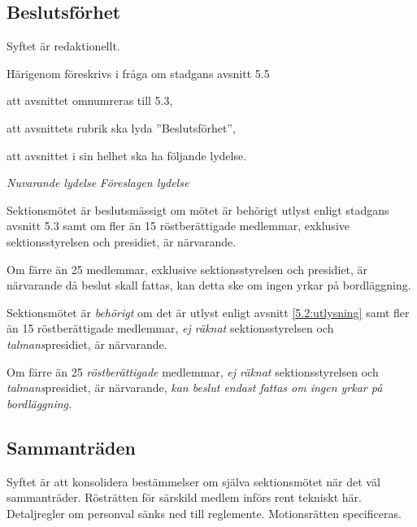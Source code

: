 \documentclass{article}
\newenvironment{lydelse}
    {\begin{paracol}{2}%
        \emph{Nuvarande lydelse}%
        \switchcolumn%
        \emph{Föreslagen lydelse}%
    \end{paracol}%
    \begin{enumerate}[label=\thesubsection.\arabic*]%
    \begin{paracol}{2}%
    }{\end{paracol}\end{enumerate}}
\begin{document}
\setcounter{subsection}{2}
\subsection{Beslutsförhet}
Syftet är redaktionellt.

Härigenom föreskrivs i fråga om stadgans avsnitt 5.5
\begin{dels}
  \item att avsnittet omnumreras till 5.3,
  \item att avsnittets rubrik ska lyda ''Beslutsförhet'',
  \item att avsnittet i sin helhet ska ha följande lydelse.
\end{dels}

\begin{lydelse}
  \setcounter{subsection}{5}
  \item Sektionsmötet är beslutsmässigt om mötet är behörigt utlyst enligt stadgans avsnitt 5.3 samt om fler än 15 röstberättigade medlemmar, exklusive sektionsstyrelsen och presidiet, är närvarande.
  \item Om färre än 25 medlemmar, exklusive sektionsstyrelsen och presidiet, är närvarande då beslut skall fattas, kan detta ske om ingen yrkar på bordläggning.

\switchcolumn
  \setcounter{subsection}{3}
  \item Sektionsmötet är \emph{behörigt} om det är utlyst enligt avsnitt \ref{5.2:utlysning} samt fler än 15 röstberättigade medlemmar, \emph{ej räknat} sektionsstyrelsen och \emph{talmans}presidiet, är närvarande.
  \item Om färre än 25 \emph{röstberättigade} medlemmar, \emph{ej räknat} sektionsstyrelsen och \emph{talmans}presidiet, är närvarande, \emph{kan beslut endast fattas om ingen yrkar på bordläggning.}
\end{lydelse}

\setcounter{subsection}{3}
\subsection{Sammanträden}
Syftet är att konsolidera bestämmelser om själva sektionsmötet när det väl sammanträder.
Rösträtten för särskild medlem införs rent tekniskt här.
Detaljregler om personval sänks ned till reglemente.
Motionsrätten specificeras.
\end{document}
